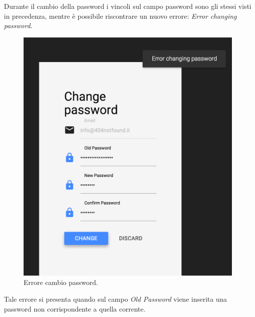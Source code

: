 Durante il cambio della password i vincoli sul campo password sono gli stessi visti in precedenza, mentre è possibile riscontrare un nuovo errore: \emph{Error changing password}.

\begin{figure}[H]
\begin{center}
\includegraphics[scale=0.35]{img/change_pass_error.png}
\caption{Errore cambio password.}
\end{center}
\end{figure}

Tale errore si presenta quando sul campo \emph{Old Password} viene inserita una password non corrispondente a quella corrente.
